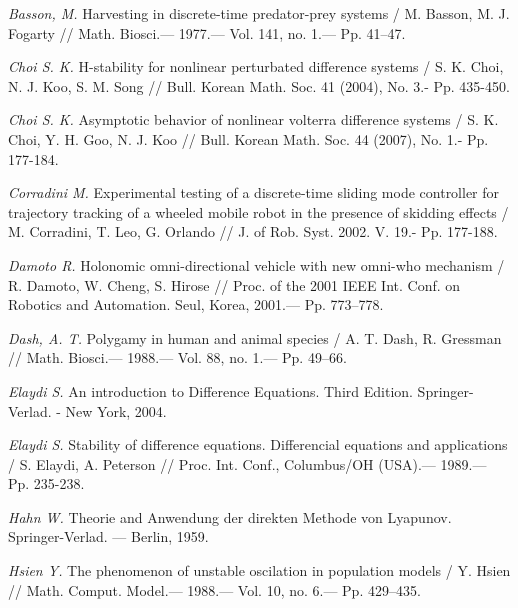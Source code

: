 \begin{thebibliography}{10}
	{\it Basson, M.} Harvesting in discrete-time predator-prey systems / M. Basson, M. J. Fogarty // Math. Biosci.— 1977.— Vol. 141, no. 1.— Pp. 41–47.
	
	
	
	{\it Choi S. K.} H-stability for nonlinear perturbated difference systems / S. K. Choi, N. J. Koo, S. M. Song // Bull. Korean Math. Soc. 41 (2004), No. 3.- Pp. 435-450.
	
	{\it Choi S. K.} Asymptotic behavior of nonlinear volterra difference systems / S. K. Choi, Y. H. Goo, N. J. Koo // Bull. Korean Math. Soc. 44 (2007), No. 1.- Pp. 177-184.
	
	
	{\it Corradini M.} Experimental testing of a discrete-time sliding mode controller for trajectory tracking of a wheeled mobile robot in the presence of skidding effects / M. Corradini, T. Leo, G. Orlando // J. of Rob. Syst. 2002. V. 19.- Pp. 177-188.
	
	{\it Damoto R.} Holonomic omni-directional vehicle with new omni-who mechanism / R. Damoto, W. Cheng, S. Hirose // Proc. of the 2001 IEEE Int. Conf. on Robotics and Automation. Seul, Korea, 2001.— Pp. 773–778.
	
	
	{\it Dash, A. T.} Polygamy in human and animal species / A. T. Dash, R. Gressman // Math. Biosci.— 1988.— Vol. 88, no. 1.— Pp. 49–66.
	
	
	{\it Elaydi S.} An introduction to Difference Equations. Third Edition. Springer-Verlad. - New York, 2004.
	
	{\it Elaydi S.} Stability of difference equations. Differencial equations and applications / S. Elaydi, A. Peterson // Proc. Int. Conf., Columbus/OH (USA).— 1989.— Pp. 235-238.
	
	{\it Hahn W.} Theorie and Anwendung der direkten Methode von Lyapunov. Springer-Verlad. — Berlin, 1959.
	
	{\it Hsien Y.} The phenomenon of unstable oscilation in population models / Y. Hsien // Math. Comput. Model.— 1988.— Vol. 10, no. 6.— Pp. 429–435.
	
	

\end{thebibliography}
